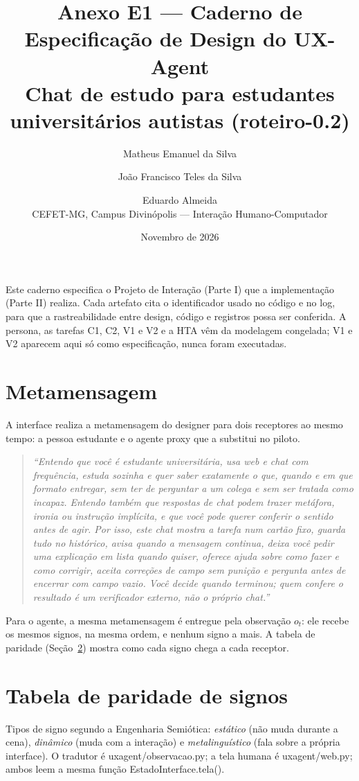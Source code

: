 \documentclass[10pt,a4paper]{article}
\title{Anexo E1 — Caderno de Especificação de Design do UX-Agent\\\large Chat de estudo para estudantes universitários autistas (roteiro-0.2)}
\author{Matheus Emanuel da Silva \and João Francisco Teles da Silva \and Eduardo Almeida\\CEFET-MG, Campus Divinópolis — Interação Humano-Computador}
\date{Novembro de 2026}
\newcommand{\cod}[1]{{\ttfamily\small\def\_{\textunderscore\allowbreak}#1}}
\begin{document}
\maketitle

\noindent Este caderno especifica o Projeto de Interação (Parte I) que a implementação (Parte II) realiza. Cada artefato cita o identificador usado no código e no log, para que a rastreabilidade entre design, código e registros possa ser conferida. A persona, as tarefas C1, C2, V1 e V2 e a HTA vêm da modelagem congelada; V1 e V2 aparecem aqui só como especificação, nunca foram executadas.

\tableofcontents

\section{Metamensagem}
A interface realiza a metamensagem do designer para dois receptores ao mesmo tempo: a pessoa estudante e o agente proxy que a substitui no piloto.

\begin{quote}\itshape
``Entendo que você é estudante universitária, usa web e chat com frequência, estuda sozinha e quer saber exatamente o que, quando e em que formato entregar, sem ter de perguntar a um colega e sem ser tratada como incapaz. Entendo também que respostas de chat podem trazer metáfora, ironia ou instrução implícita, e que você pode querer conferir o sentido antes de agir. Por isso, este chat mostra a tarefa num cartão fixo, guarda tudo no histórico, avisa quando a mensagem continua, deixa você pedir uma explicação em lista quando quiser, oferece ajuda sobre como fazer e como corrigir, aceita correções de campo sem punição e pergunta antes de encerrar com campo vazio. Você decide quando terminou; quem confere o resultado é um verificador externo, não o próprio chat.''
\end{quote}

Para o agente, a mesma metamensagem é entregue pela observação $o_t$: ele recebe os mesmos signos, na mesma ordem, e nenhum signo a mais. A tabela de paridade (Seção~\ref{sec:paridade}) mostra como cada signo chega a cada receptor.

\section{Tabela de paridade de signos}\label{sec:paridade}
Tipos de signo segundo a Engenharia Semiótica: \emph{estático} (não muda durante a cena), \emph{dinâmico} (muda com a interação) e \emph{metalinguístico} (fala sobre a própria interface). O tradutor é \cod{uxagent/observacao.py}; a tela humana é \cod{uxagent/web.py}; ambos leem a mesma função \cod{EstadoInterface.tela()}.
\end{document}
